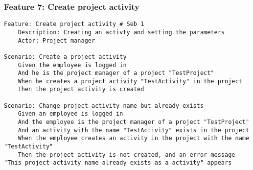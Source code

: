 \subsubsection{Feature 7: Create project activity} %
\begin{lstlisting}
Feature: Create project activity # Seb 1
    Description: Creating an activty and setting the parameters
    Actor: Project manager

Scenario: Create a project activity
    Given the employee is logged in
    And he is the project manager of a project "TestProject"
    When he creates a project activity "TestActivity" in the project
    Then the project activity is created

Scenario: Change project activity name but already exists
    Given an employee is logged in
    And the employee is the project manager of a project "TestProject"
    And an activity with the name "TestActivity" exists in the project
    When the employee creates an activity in the project with the name "TestActivity"
    Then the project activity is not created, and an error message "This project activity name already exists as a activity" appears
 \end{lstlisting}   

